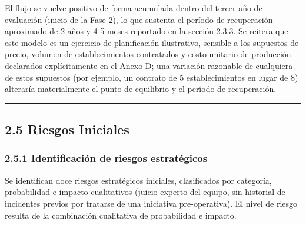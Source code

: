 \documentclass[11pt,a4paper]{article}
\begin{document}
El flujo se vuelve positivo de forma acumulada dentro del tercer año de evaluación (inicio de la Fase 2), lo que sustenta el período de recuperación aproximado de 2 años y 4-5 meses reportado en la sección 2.3.3. Se reitera que este modelo es un ejercicio de planificación ilustrativo, sensible a los supuestos de precio, volumen de establecimientos contratados y costo unitario de producción declarados explícitamente en el Anexo D; una variación razonable de cualquiera de estos supuestos (por ejemplo, un contrato de 5 establecimientos en lugar de 8) alteraría materialmente el punto de equilibrio y el período de recuperación.

\begin{center}\rule{0.5\linewidth}{0.5pt}\end{center}

\subsection{2.5 Riesgos Iniciales}\label{riesgos-iniciales}

\subsubsection{2.5.1 Identificación de riesgos estratégicos}\label{identificaciuxf3n-de-riesgos-estratuxe9gicos}

Se identifican doce riesgos estratégicos iniciales, clasificados por categoría, probabilidad e impacto cualitativos (juicio experto del equipo, sin historial de incidentes previos por tratarse de una iniciativa pre-operativa). El nivel de riesgo resulta de la combinación cualitativa de probabilidad e impacto.
\end{document}
